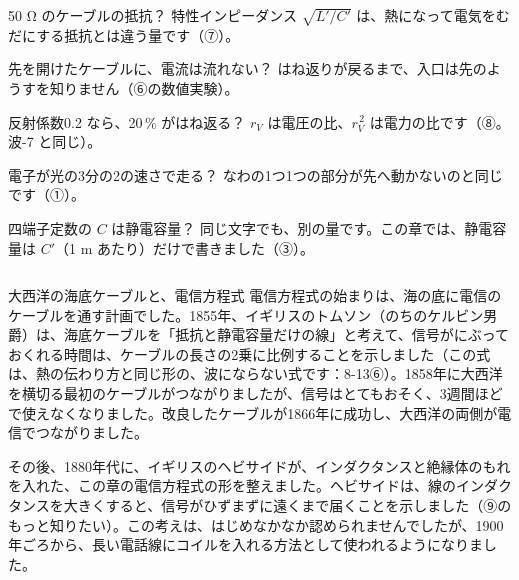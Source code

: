 \begin{tsumazuki}{50 Ω のケーブルの抵抗？}
特性インピーダンス $\sqrt{L'/C'}$ は、熱になって電気をむだにする抵抗とは違う量です（⑦）。
\end{tsumazuki}

\begin{tsumazuki}{先を開けたケーブルに、電流は流れない？}
はね返りが戻るまで、入口は先のようすを知りません（⑥の数値実験）。
\end{tsumazuki}

\begin{tsumazuki}{反射係数0.2 なら、20\,\% がはね返る？}
$r_V$ は電圧の比、$r_V^{\,2}$ は電力の比です（⑧。波-7 と同じ）。
\end{tsumazuki}

\begin{tsumazuki}{電子が光の3分の2の速さで走る？}
なわの1つ1つの部分が先へ動かないのと同じです（①）。
\end{tsumazuki}

\begin{tsumazuki}{四端子定数の $C$ は静電容量？}
同じ文字でも、別の量です。この章では、静電容量は $C'$（1 m あたり）だけで書きました（③）。
\end{tsumazuki}

\begin{column}{大西洋の海底ケーブルと、電信方程式}
電信方程式の始まりは、海の底に電信のケーブルを通す計画でした。1855年、イギリスのトムソン（のちのケルビン男爵）は、海底ケーブルを「抵抗と静電容量だけの線」と考えて、信号がにぶっておくれる時間は、ケーブルの長さの2乗に比例することを示しました（この式は、熱の伝わり方と同じ形の、波にならない式です：8-13⑥）。1858年に大西洋を横切る最初のケーブルがつながりましたが、信号はとてもおそく、3週間ほどで使えなくなりました。改良したケーブルが1866年に成功し、大西洋の両側が電信でつながりました。

その後、1880年代に、イギリスのヘビサイドが、インダクタンスと絶縁体のもれを入れた、この章の電信方程式の形を整えました。ヘビサイドは、線のインダクタンスを大きくすると、信号がひずまずに遠くまで届くことを示しました（⑨のもっと知りたい）。この考えは、はじめなかなか認められませんでしたが、1900年ごろから、長い電話線にコイルを入れる方法として使われるようになりました。
\end{column}

